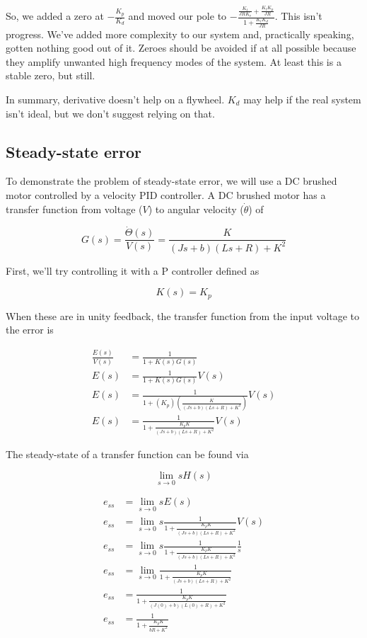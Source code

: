 So, we added a zero at $-\frac{K_p}{K_d}$ and moved our pole to
$-\frac{\frac{K_t}{JRK_v} + \frac{K_t K_p}{JR}}{1 + \frac{K_t K_d}{JR}}$. This
isn't progress. We've added more complexity to our system and, practically
speaking, gotten nothing good out of it. Zeroes should be avoided if at all
possible because they amplify unwanted high frequency modes of the system. At
least this is a stable zero, but still.

In summary, derivative doesn't help on a flywheel. $K_d$ may help if the real
system isn't ideal, but we don't suggest relying on that.

\subsection{Steady-state error}

To demonstrate the problem of \gls{steady-state error}, we will use a DC brushed
motor controlled by a velocity PID controller. A DC brushed motor has a transfer
function from voltage ($V$) to angular velocity ($\dot{\theta}$) of

\begin{equation}
  G(s) = \frac{\dot{\Theta}(s)}{V(s)} = \frac{K}{(Js+b)(Ls+R)+K^2}
\end{equation}

First, we'll try controlling it with a P controller defined as

\begin{equation*}
  K(s) = K_p
\end{equation*}

When these are in unity feedback, the transfer function from the input voltage
to the error is

\begin{align*}
  \frac{E(s)}{V(s)} &= \frac{1}{1 + K(s)G(s)} \\
  E(s) &= \frac{1}{1 + K(s)G(s)} V(s) \\
  E(s) &= \frac{1}{1 + (K_p) \left(\frac{K}{(Js+b)(Ls+R)+K^2}\right)} V(s) \\
  E(s) &= \frac{1}{1 + \frac{K_p K}{(Js+b)(Ls+R)+K^2}} V(s)
\end{align*}

The steady-state of a transfer function can be found via

\begin{equation}
  \lim_{s\to0} sH(s)
\end{equation}

\begin{align}
  e_{ss} &= \lim_{s\to0} sE(s) \nonumber \\
  e_{ss} &= \lim_{s\to0} s \frac{1}{1 + \frac{K_p K}{(Js+b)(Ls+R)+K^2}} V(s)
    \nonumber \\
  e_{ss} &= \lim_{s\to0} s \frac{1}{1 + \frac{K_p K}{(Js+b)(Ls+R)+K^2}}
    \frac{1}{s} \nonumber \\
  e_{ss} &= \lim_{s\to0} \frac{1}{1 + \frac{K_p K}{(Js+b)(Ls+R)+K^2}}
    \nonumber \\
  e_{ss} &= \frac{1}{1 + \frac{K_p K}{(J(0)+b)(L(0)+R)+K^2}} \nonumber \\
  e_{ss} &= \frac{1}{1 + \frac{K_p K}{bR+K^2}} \label{eq:ss_nonzero}
\end{align}

